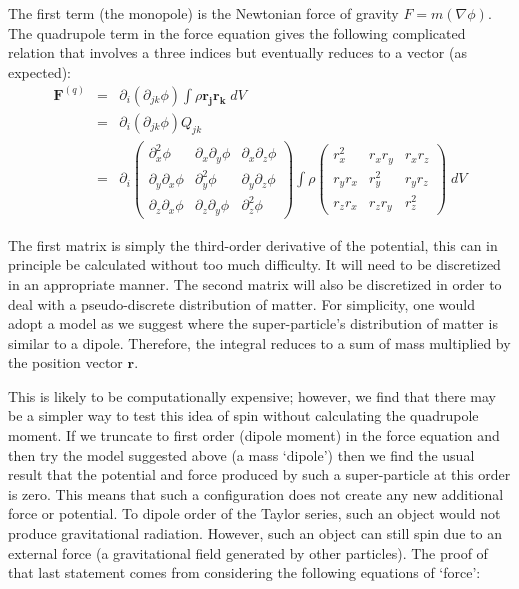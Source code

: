 \noindent The first term (the monopole) is the Newtonian force of gravity $F = m(\nabla\phi)$. The quadrupole term in the force equation gives the following complicated relation that involves a three indices but eventually reduces to a vector (as expected):
\begin{eqnarray}
\label{quadforce}
\mathbf{F}^{(q)} &=& \partial_i(\partial_{jk} \phi) \int \rho \mathbf{r_j} \mathbf{r_k}\;dV \\
&=& \partial_i(\partial_{jk} \phi) Q_{jk} \\
&=& \partial_i \left(\begin{array}{ccc}
\partial_x^2 \phi & \partial_x \partial_y\phi & \partial_x \partial_z\phi  \\
\partial_y \partial_x\phi & \partial_y^2\phi & \partial_y\partial_z\phi \\
\partial_z \partial_x\phi & \partial_z \partial_y\phi & \partial_z^2\phi
\end{array}\right) \int \rho
\left(\begin{array}{ccc}
r_x^2 & r_x r_y & r_x r_z  \\
r_y r_x & r_y^2 & r_y r_z \\
r_z r_x & r_z r_y & r_z^2
\end{array}\right) \; dV
\end{eqnarray}

\noindent The first matrix is simply the third-order derivative of the potential, this can in principle be calculated without too much difficulty. It will need to be discretized in an appropriate manner. The second matrix will also be discretized in order to deal with a pseudo-discrete distribution of matter. For simplicity, one would adopt a model as we suggest where the super-particle's distribution of matter is similar to a dipole. Therefore, the integral reduces to a sum of mass multiplied by the position vector $\mathbf{r}$.

This is likely to be computationally expensive; however, we find that there may be a simpler way to test this idea of spin without calculating the quadrupole moment. If we truncate to first order (dipole moment) in the force equation and then try the model suggested above (a mass `dipole') then we find the usual result that the potential and force produced by such a super-particle at this order is zero. This means that such a configuration does not create any new additional force or potential. To dipole order of the Taylor series, such an object would not produce gravitational radiation. However, such an object can still spin due to an external force (a gravitational field generated by other particles). The proof of that last statement comes from considering the following equations of `force':

